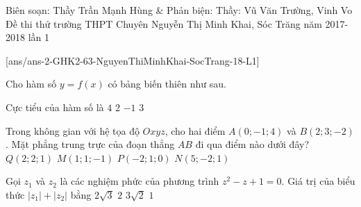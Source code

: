 \begin{name}
{Biên soạn: Thầy Trần Mạnh Hùng \& Phản biện: Thầy: Vũ Văn Trường, Vinh Vo}
{Đề thi thử trường THPT Chuyên Nguyễn Thị Minh Khai, Sóc Trăng năm 2017-2018 lần 1}
\end{name}
\setcounter{ex}{0}\setcounter{bt}{0}
[ans/ans-2-GHK2-63-NguyenThiMinhKhai-SocTrang-18-L1]
\begin{ex}%
	Cho hàm số $y=f(x)$ có bảng biến thiên như sau.
		\begin{center}
	\end{center}
	Cực tiểu của hàm số là
	\choice
	{$4$}
	{$2$}
	{$-1$}
	{\True $3$}
\end{ex}
\begin{ex}%
	Trong không gian với hệ tọa độ $Oxyz$, cho hai điểm $A(0;-1;4)$ và $B(2;3;-2)$. Mặt phẳng trung trực của đoạn thẳng $AB$ đi qua điểm nào dưới đây?
	\choice
	{$Q(2;2;1)$}
	{$M(1;1;-1)$}
	{\True $P(-2;1;0)$}
	{$N(5;-2;1)$}
\end{ex}
\begin{ex}%
	Gọi $z_1$ và $z_2$ là các nghiệm phức của phương trình $z^2-z+1=0$. Giá trị của biểu thức $\left|z_1\right|+\left|z_2\right|$ bằng
	\choice
	{$2\sqrt{3}$}
	{\True $2$}
	{$3\sqrt{2}$}
	{$1$}
\end{ex}
